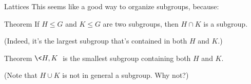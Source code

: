 \documentclass[8pt, handout]{beamer}
\newcommand{\Pause}{\pause}      %
\begin{document}
\begin{frame}{Lattices}
  This seems like a good way to organize subgroups, because: \Pause

  \begin{block}{Theorem}
    If $H \leq G$ and $K \leq G$ are two subgroups, then $H\cap K$ is a subgroup. \Pause

    (Indeed, it's the largest subgroup that's contained in both $H$ and $K$.)
  \end{block} \Pause

  \begin{block}{Theorem}
    $\<H, K\>$ is the smallest subgroup containing both $H$ and $K$. \Pause

    (Note that $H \cup K$ is not in general a subgroup. Why not?)
  \end{block}
\end{frame}
\end{document}
